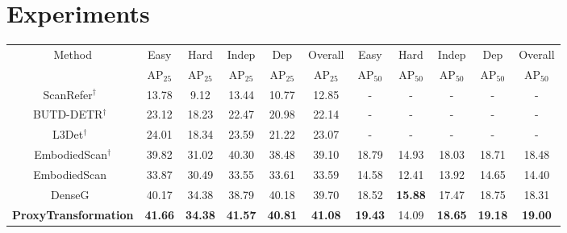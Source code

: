 \section{Experiments}
\label{sec:experiments}
\begin{table*}
    \centering
    \begin{tabular}{c|c@{\hskip 4pt}c|c@{\hskip 2pt}c|c|c@{\hskip 4pt}c|c@{\hskip 2pt}c|c}
    \toprule
    \multirow{2}{*}{Method}  & Easy & Hard & Indep & Dep & Overall & Easy & Hard & Indep & Dep & Overall\\
    & AP$_{25}$ & AP$_{25}$ & AP$_{25}$ & AP$_{25}$ & AP$_{25}$& AP$_{50}$ & AP$_{50}$ & AP$_{50}$ & AP$_{50}$ & AP$_{50}$ \\
    \midrule
    ScanRefer$^\dagger$~\cite{chen2020scanrefer}  & 13.78& 9.12& 13.44& 10.77&12.85 &- & -& -&- & -\\
    BUTD-DETR$^\dagger$~\cite{jain2022bottom}  & 23.12& 18.23& 22.47& 20.98&22.14 & -& - & - & - & -\\
    L3Det$^\dagger$~\cite{zhu2023object2sceneputtingobjectscontext}  & 24.01& 18.34& 23.59& 21.22&23.07 & - & - & - & - &- \\
    EmbodiedScan$^\dagger$  & 39.82 & 31.02 & 40.30 & 38.48 & 39.10 & 18.79  & 14.93  &  18.03 &  18.71 & 18.48\\

    EmbodiedScan~\cite{wang2023embodiedscan}  & 33.87& 30.49& 33.55& 33.61&33.59 & 14.58& 12.41& 13.92& 14.65&14.40\\

    DenseG~\cite{zhengdenseg} &40.17 &34.38 &38.79 &40.18 &39.70 &18.52 &\textbf{15.88} &17.47 &18.75 &18.31 \\

    \textbf{ProxyTransformation} &
    \textbf{41.66}   &
    \textbf{34.38}  &
    \textbf{41.57} &
    \textbf{40.81} & 
    \textbf{41.08}
    &
    \textbf{19.43}  &
    14.09  &
    \textbf{18.65} &
    \textbf{19.18} & 
    \textbf{19.00}\\

    \bottomrule
    \end{tabular}
    \caption{Main Results on the official validation set. The table displays accuracy performance considering instances where IoU exceeds 25\% and 50\% under different circumstance as mentioned in~\cref{sec:experiments}. 'Indep' and 'Dep' mean the targets are view-independent and view-dependent. And $^\dagger$ denotes that models are trained on full train dataset. Although our model is trained on mini train dataset (approximately 20\% of the full data), but it still surpasses previous methods trained on the full train dataset.}
    \label{table:val}
\end{table*}

